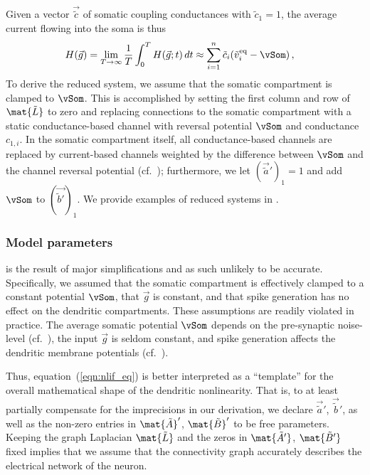 Given a vector $\vec{\tilde c}$ of somatic coupling conductances with $\tilde c_1 = 1$, the average current flowing into the soma is thus
\begin{align}
	H(\vec g) &= \lim_{T \to \infty} \frac{1}T \int_{0}^T H(\vec g; t) \,dt \approx \sum_{i = 1}^n \tilde c_i (\tilde v^\mathrm{eq}_i - \vSom) \,,
	\label{eqn:h_model}
\end{align}
To derive the reduced system, we assume that the somatic compartment is clamped to $\vSom$.
This is accomplished by setting the first column and row of $\mat{\tilde L}$ to zero and replacing connections to the somatic compartment with a static conductance-based channel with reversal potential $\vSom$ and conductance $c_{1, i}$.
In the somatic compartment itself, all conductance-based channels are replaced by current-based channels weighted by the difference between $\vSom$ and the channel reversal potential (cf.~\cite{stockel2017point}); furthermore, we let $(\vec {\tilde a}')_1 = 1$ and add $\vSom$ to $(\vec {\tilde b'})_1$.
We provide examples of reduced systems in .

\subsubsection{Model parameters}
 is the result of major simplifications and as such unlikely to be accurate.
Specifically, we assumed that the somatic compartment is effectively clamped to a constant potential $\vSom$, that $\vec g$ is constant, and that spike generation has no effect on the dendritic compartments.
These assumptions are readily violated in practice.
The average somatic potential $\vSom$ depends on the pre-synaptic noise-level (cf.~), the input $\vec g$ is seldom constant, and spike generation affects the dendritic membrane potentials (cf.~).

Thus, equation~(\ref{eqn:nlif_eq}) is better interpreted as a \enquote{template} for the overall mathematical shape of the dendritic nonlinearity.
That is, to at least partially compensate for the imprecisions in our derivation, we declare $\vec{\tilde a}'$, $\vec{\tilde b}'$, as well as the non-zero entries in $\mat{\tilde A}'$, $\mat{\tilde B}'$ to be free parameters.
Keeping the graph Laplacian $\mat{\tilde L}$ and the zeros in $\mat{\tilde A'}$, $\mat{\tilde B'}$ fixed implies that we assume that the connectivity graph accurately describes the electrical network of the neuron.

